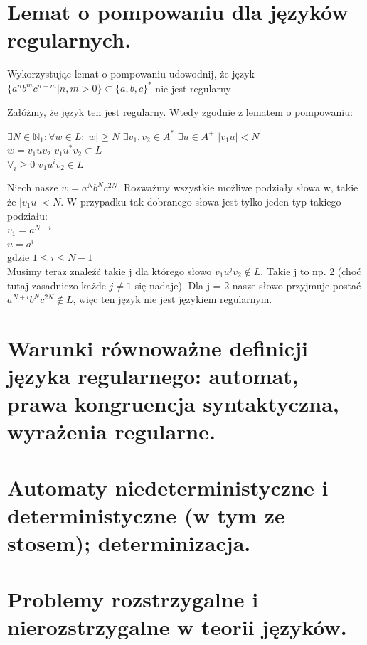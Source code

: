 \documentclass[12pt]{article}
\begin{document}
	\newpage

    \section{Lemat o pompowaniu dla języków regularnych.}
	\begin{exercise}
		Wykorzystując lemat o pompowaniu udowodnij, że język $\{a^nb^mc^{n+m} | n, m > 0\} \subset \{a, b, c\}^*$ nie jest regularny
	\end{exercise}

	\noindent Załóżmy, że język ten jest regularny. Wtedy zgodnie z lematem o pompowaniu:
	\begin{center}
		$\exists N \in \mathbb{N}_1 : \forall w \in L : |w| \geq N$ $\exists v_1, v_2 \in A^*$ $\exists u \in A^+$ $|v_1u| < N$ \\
		$w = v_1uv_2$   $v_1u^*v_2 \subset L$ \\
		$\forall_i \geq 0$    $v_1u^iv_2 \in L$
	\end{center}

	\noindent Niech nasze $w = a^Nb^Nc^{2N}$. Rozważmy wszystkie możliwe podziały słowa w, takie że $|v_1u| < N$. W przypadku tak dobranego słowa jest tylko jeden typ takiego podziału: \\
	\noindent $v_1 = a^{N-i}$ \\
	\noindent $u = a^i$ \\
	\noindent gdzie $1 \leq i \leq N-1$ \\

	\noindent Musimy teraz znaleźć takie j dla którego słowo $v_1u^jv_2 \notin L$. Takie j to np. 2 (choć tutaj zasadniczo każde $j \neq 1$ się nadaje).
	Dla j = 2 nasze słowo przyjmuje postać $a^{N+i}b^Nc^{2N} \notin L$, więc ten język nie jest językiem regularnym.

    \section{Warunki równoważne definicji języka regularnego: automat, prawa kongruencja syntaktyczna, wyrażenia regularne.}
    \section{Automaty niedeterministyczne i deterministyczne (w tym ze stosem); determinizacja.}
    \section{Problemy rozstrzygalne i nierozstrzygalne w teorii języków.}
\end{document}
